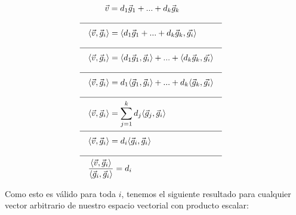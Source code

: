 \documentclass[12pt,dvipsnames]{article}
\numberwithin{equation}{section}
\begin{document}
\begin{align*}
    & & & \quad \quad \vec{v}= d_1\vec{g}_1 + ... + d_k\vec{g}_k& & & \\
    \cline{1-8}
    & & &\langle \vec{v} , \vec{g}_i \rangle = \langle d_1\vec{g}_1 + ... + d_k\vec{g}_k , \vec{g_i} \rangle& & & \\
    \cline{1-8}
    & & &\langle \vec{v} , \vec{g}_i \rangle = \langle d_1\vec{g}_1,\vec{g}_i\rangle + ... + \langle d_k\vec{g}_k , \vec{g_i} \rangle& & & \\
    \cline{1-8}
    & & &\langle \vec{v} , \vec{g}_i \rangle = d_1\langle \vec{g}_1, \vec{g}_i\rangle + ... + d_k\langle \vec{g}_k , \vec{g_i} \rangle& & & \\
    \cline{1-8}
    & & &\langle \vec{v} , \vec{g}_i \rangle = \sum_{j=1}^k d_j\langle \vec{g}_j, \vec{g}_i\rangle& & & \\
    \cline{1-8}
    & & &\langle \vec{v} , \vec{g}_i \rangle = d_i \langle\vec{g}_i, \vec{g}_i\rangle& & & \\
    \cline{1-8}
    & & &\frac{\langle \vec{v} ,\vec{g}_i \rangle}{\langle\vec{g}_i, \vec{g}_i\rangle} = d_i& & &
\end{align*}

Como esto es válido para toda $i$, tenemos el siguiente resultado para cualquier vector arbitrario de nuestro espacio vectorial con producto escalar:
\end{document}
